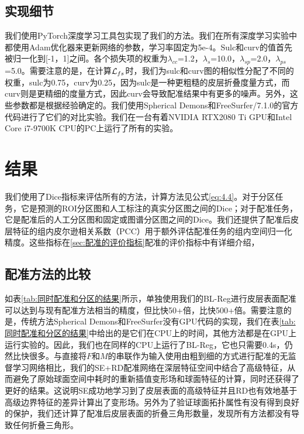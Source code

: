 \subsection{实现细节}
我们使用PyTorch深度学习工具包实现了我们的方法。我们在所有深度学习实验中都使用Adam优化器\cite{kingma2014adam}来更新网络的参数，学习率固定为5e-4。Sulc和curv的值首先被归一化到[-1，1]之间。各个损失项的权重为$\lambda_{cc}$=1.2，$\lambda_s$=10.0，$\lambda_{sp}$=2.0，$\lambda_{ps}$=5.0。需要注意的是，在计算${\cal L}_{fs}$时，我们为sulc和curv图的相似性分配了不同的权重，sulc为0.75，curv为0.25，因为sulc是一种更粗糙的皮层折叠度量方式，而curv则是更精细的度量方式，因此curv会导致配准结果中有更多的噪声。另外，这些参数都是根据经验确定的。我们使用Spherical Demons和FreeSurfer/7.1.0的官方代码进行了它们的对比实验。我们在一台有着NVIDIA RTX2080 Ti GPU和Intel Core i7-9700K CPU的PC上运行了所有的实验。


\section{结果}
我们使用了Dice指标来评估所有的方法，计算方法见公式\ref{eq:4.4}。对于分区任务，它是预测的ROI分区图和人工标注的真实分区图之间的Dice；对于配准任务，它是配准后的人工分区图和固定或图谱分区图之间的Dice。我们还提供了配准后皮层特征的组内皮尔逊相关系数（PCC）用于额外评估配准任务的组内空间归一化精度。这些指标在\ref{sec:配准的评价指标}配准的评价指标中有详细介绍，

\subsection{配准方法的比较}
如表\ref{tab:同时配准和分区的结果}所示，单独使用我们的BL-Reg进行皮层表面配准可以达到与现有配准方法相当的精度，但比\cite{zhao2020unsupervised}快50+倍，比\cite{yeo2009spherical,fischl1999high}快500+倍。需要注意的是，传统方法Spherical Demons\cite{yeo2009spherical}和FreeSurfer\cite{fischl1999high}没有GPU代码的实现，我们在表\ref{tab:同时配准和分区的结果}中给出的是它们在CPU上的时间，其他方法都是在GPU上运行实验的。因此，我们也在同样的CPU上运行了BL-Reg，它也只需要0.4s，仍然比\cite{yeo2009spherical,fischl1999high}快很多。与直接将$F$和$M$的串联作为输入使用由粗到细的方式进行配准的无监督学习网络\cite{zhao2020unsupervised}相比，我们的SE+RD配准网络在深层特征空间中结合了高级特征，从而避免了原始球面空间中耗时的重新插值变形场和球面特征的计算，同时还获得了更好的结果。这说明SE成功地学习到了皮层表面的高级特征并且RD也有效地基于高级边界特征的差异计算出了变形场。另外为了验证球面拓扑属性有没有得到良好的保护，我们还计算了配准后皮层表面的折叠三角形\cite{moller1997fast}数量，发现所有方法都没有导致任何折叠三角形。

